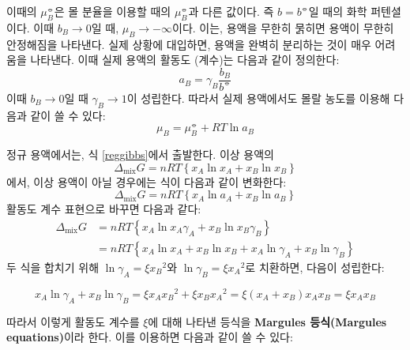         이때의 $\mu_B^\circlehbar$은 몰 분율을 이용할 때의 $\mu_B^\circlehbar$과 다른 값이다. 즉 $b = b^\circlehbar$일 때의 화학 퍼텐셜이다.
        이때 $b_B\rightarrow 0$일 때, $\mu_B \rightarrow -\infty$이다. 이는, 용액을 무한히 묽히면 용액이 무한히 안정해짐을 나타낸다. 
        실제 상황에 대입하면, 용액을 완벽히 분리하는 것이 매우 어려움을 나타낸다. 이때 실제 용액의 활동도 (계수)는 다음과 같이 정의한다:
        \begin{equation*}
            a_B = \gamma_B \frac{b_B}{b^\circlehbar}
        \end{equation*}
        이때 $b_B \rightarrow 0$일 때 $\gamma_B \rightarrow 1$이 성립한다. 따라서 실제 용액에서도 몰랄 농도를 이용해 다음과 같이 쓸 수 있다:
        \begin{equation*}
            \mu_B = \mu_B^\circlehbar + RT\ln{a_B}
        \end{equation*}
        \par 정규 용액에서는, 식 \ref{reggibbs}에서 출발한다. 이상 용액의 \\
        $$
        \Delta_\mathrm{mix}G = nRT\left\{x_A\ln{x_A} + x_B\ln{x_B}\right\}
        $$
        에서, 이상 용액이 아닐 경우에는 식이 다음과 같이 변화한다:
        \begin{equation*}
            \Delta_\mathrm{mix}G = nRT\left\{x_A\ln{a_A} + x_B\ln{a_B}\right\}
        \end{equation*}
        활동도 계수 표현으로 바꾸면 다음과 같다:
        \begin{equation*}
            \begin{aligned}
                \Delta_\mathrm{mix}G &= nRT\left\{x_A\ln{x_A\gamma_A}+x_B\ln{x_B\gamma_B}\right\}\\
                &= nRT\left\{x_A\ln{x_A} + x_B\ln{x_B}+x_A\ln{\gamma_A}+x_B\ln{\gamma_B}\right\}
            \end{aligned}
        \end{equation*}
        두 식을 합치기 위해 $\ln{\gamma_A} = \xi {x_B}^2$와 $\ln{\gamma_B} = \xi {x_A}^2$로 치환하면, 
        다음이 성립한다:
        \begin{obs}[Margules 등식]
        \begin{equation*}
            x_A \ln{\gamma_A}+x_B\ln{\gamma_B} = \xi x_A {x_B}^2+\xi x_B {x_A}^2 = \xi\left(x_A+x_B\right)x_A x_B = \xi x_A x_B
        \end{equation*}
        \end{obs}
        따라서 이렇게 활동도 계수를 $\xi$에 대해 나타낸 등식을 
        \textbf{Margules 등식(Margules equations)}이라 한다. 이를 이용하면 다음과 같이 쓸 수 있다:
